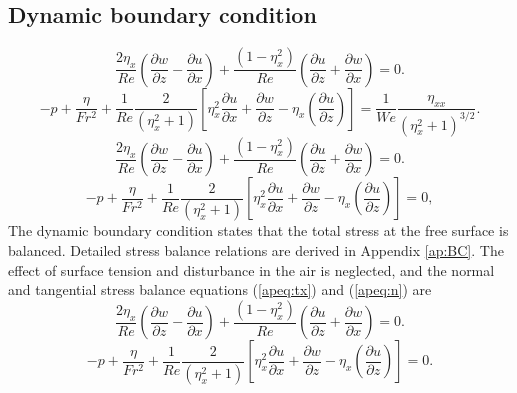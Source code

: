 \subsection{Dynamic boundary condition}
\begin{equation}
    \frac{2\eta _{x}}{Re}\left(\frac{\partial w}{\partial z} -\frac{\partial u}{\partial x}\right) +\frac{\left( 1-\eta _{x}^{2}\right)}{Re}\left(\frac{\partial u}{\partial z} +\frac{\partial w}{\partial x}\right) =0.
\end{equation}
\begin{equation}
    \displaystyle -p+\frac{\eta }{Fr^{2}} +\frac{1}{Re}\frac{2}{\left( \eta _{x}^{2} +1\right)}\left[ \eta _{x}^{2}\frac{\partial u}{\partial x} +\frac{\partial w}{\partial z} -\eta _{x}\left(\frac{\partial u}{\partial z}\right)\right] =\frac{1}{We}\frac{\eta _{xx}}{\left( \eta _{x}^{2} +1\right)^{3/2}}.
\end{equation}
\begin{equation}
    \frac{2\eta _{x}}{Re}\left(\frac{\partial w}{\partial z} -\frac{\partial u}{\partial x}\right) +\frac{\left( 1-\eta _{x}^{2}\right)}{Re}\left(\frac{\partial u}{\partial z} +\frac{\partial w}{\partial x}\right) =0.
    \label{eq:tbc1}
\end{equation}
\begin{equation}
    \displaystyle -p+\frac{\eta }{Fr^{2}} +\frac{1}{Re}\frac{2}{\left( \eta _{x}^{2} +1\right)}\left[ \eta _{x}^{2}\frac{\partial u}{\partial x} +\frac{\partial w}{\partial z} -\eta _{x}\left(\frac{\partial u}{\partial z}\right)\right] =0,
    \label{eq:nbc1}
\end{equation}
The dynamic boundary condition states that the total stress at the free surface is balanced. Detailed stress balance relations are derived in Appendix \ref{ap:BC}. The effect of surface tension and disturbance in the air is neglected, and the normal and tangential stress balance equations (\ref{apeq:tx}) and (\ref{apeq:n}) are
\begin{equation}
    \frac{2\eta _{x}}{Re}\left(\frac{\partial w}{\partial z} -\frac{\partial u}{\partial x}\right) +\frac{\left( 1-\eta _{x}^{2}\right)}{Re}\left(\frac{\partial u}{\partial z} +\frac{\partial w}{\partial x}\right) =0.
    \label{eq:tbc1}
\end{equation}
\begin{equation}
    \displaystyle -p+\frac{\eta }{Fr^{2}} +\frac{1}{Re}\frac{2}{\left( \eta _{x}^{2} +1\right)}\left[ \eta _{x}^{2}\frac{\partial u}{\partial x} +\frac{\partial w}{\partial z} -\eta _{x}\left(\frac{\partial u}{\partial z}\right)\right] =0.
    \label{eq:nbc1}
\end{equation}
